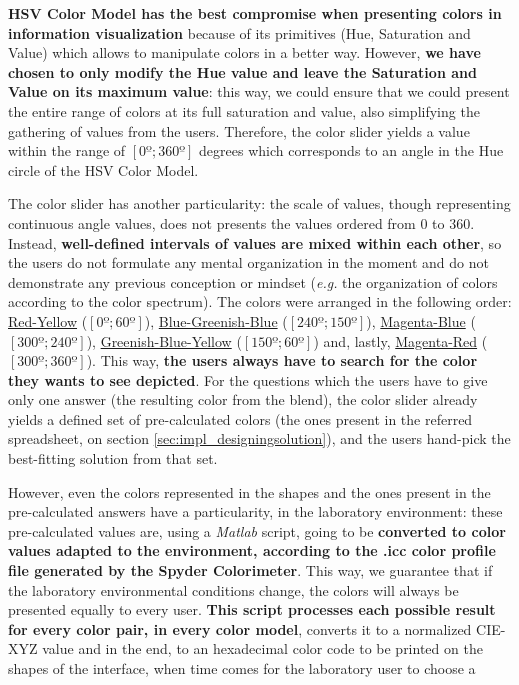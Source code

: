 \textbf{HSV Color Model has the best compromise when presenting colors in information visualization} because of its primitives (Hue, Saturation and Value)
which allows to manipulate colors in a better way. However, \textbf{we have chosen to only modify the Hue value and leave the Saturation and Value on its
maximum value}: this way, we could ensure that we could present the entire range of colors at its full saturation and value, also simplifying the gathering
of values from the users. Therefore, the color slider yields a value within the range of $[0º ; 360º]$ degrees which corresponds to an angle in the Hue circle
of the HSV Color Model. \par
%
The color slider has another particularity: the scale of values, though representing continuous angle values, does not presents the values ordered from 0 to 360.
Instead, \textbf{well-defined intervals of values are mixed within each other}, so the users do not formulate any mental organization in the moment and do not demonstrate any previous conception or mindset
(\emph{e.g.} the organization of colors according to the color spectrum). The colors were arranged in the following order: \ul{Red-Yellow} ($[0º; 60º]$),
\ul{Blue-Greenish-Blue} ($[240º; 150º]$), \ul{Magenta-Blue} ($[300º; 240º]$), \ul{Greenish-Blue-Yellow} ($[150º; 60º]$) and, lastly, \ul{Magenta-Red} ($[300º; 360º]$). This way, \textbf{the users always have to search for the
color they wants to see depicted}. For the questions which the users have to give only one answer (the resulting color from the blend), the color slider
already yields a defined set of pre-calculated colors (the ones present in the referred spreadsheet, on section \ref{sec:impl_designingsolution}), and the
users hand-pick the best-fitting solution from that set. \par
%
However, even the colors represented in the shapes and the ones present in the pre-calculated answers have a particularity, in the laboratory environment: these
pre-calculated values are, using a \emph{Matlab} script, going to be \textbf{converted to color values adapted to the environment, according to the .icc color profile
file generated by the Spyder Colorimeter}. This way, we guarantee that if the laboratory environmental conditions change, the colors will always be
presented equally to every user. \textbf{This script processes each possible result for every color pair, in every color model}, converts it to a normalized
CIE-XYZ value and in the end, to an hexadecimal color code to be printed on the shapes of the interface, when time comes for the laboratory user to choose a

